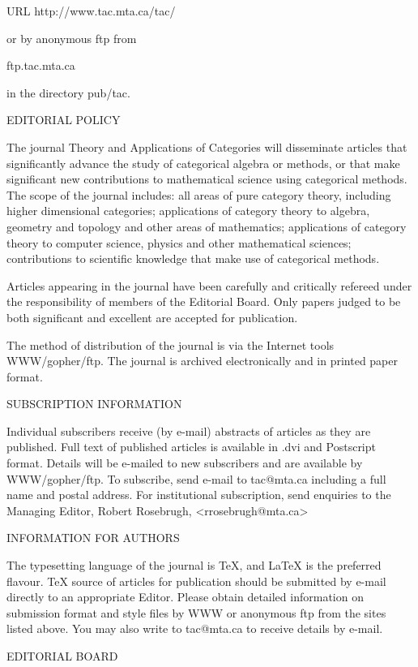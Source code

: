 URL http://www.tac.mta.ca/tac/
 
or by anonymous ftp from
 
ftp.tac.mta.ca
 
in the directory pub/tac.
 
 
EDITORIAL POLICY
 
The journal Theory and Applications of Categories will disseminate articles 
that significantly advance the study of categorical algebra or methods, or 
that make significant new contributions to mathematical science using 
categorical methods. The scope of the journal includes: all areas of 
pure category theory, including higher dimensional categories; applications 
of category theory to algebra, geometry and topology and other areas of 
mathematics; applications of category theory to computer science, physics 
and other mathematical sciences; contributions to scientific knowledge 
that make use of categorical methods.
 
Articles appearing in the journal have been carefully and critically 
refereed under the responsibility of members of the Editorial Board.
Only papers judged to be both significant and excellent are accepted for 
publication. 
 
The method of distribution of the journal is via the Internet tools 
WWW/gopher/ftp. The journal is archived electronically and in printed 
paper format. 
 
 
 
SUBSCRIPTION INFORMATION
 
Individual subscribers receive (by e-mail) abstracts of articles 
as they are published. Full text of published articles is available 
in .dvi and Postscript format. Details will be e-mailed to new 
subscribers and are available by WWW/gopher/ftp. To subscribe, 
send e-mail to tac@mta.ca including a full name and postal address. 
For institutional subscription, send enquiries to the Managing Editor, 
Robert Rosebrugh, <rrosebrugh@mta.ca>
 
 
INFORMATION FOR AUTHORS
 
The typesetting language of the journal is TeX, and LaTeX is the 
preferred flavour. TeX source of articles for publication should 
be submitted by e-mail directly to an appropriate Editor. 
Please obtain detailed information on submission format and 
style files by WWW or anonymous ftp from the sites listed above.
You may also write to tac@mta.ca to receive details by e-mail.
 
 
EDITORIAL BOARD
 
